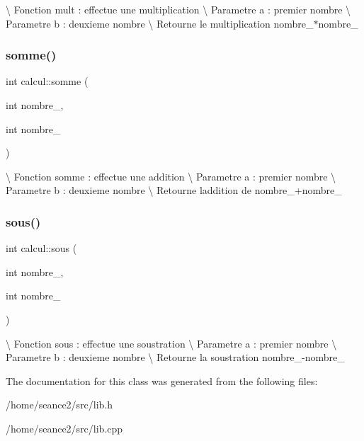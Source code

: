 \textbackslash{} Fonction mult \+: effectue une multiplication \textbackslash{} Parametre a \+: premier nombre \textbackslash{} Parametre b \+: deuxieme nombre \textbackslash{} Retourne le multiplication nombre\+\_$\ast$nombre\+\_ \mbox{\label{classcalcul_a40f51a847c5ac1001051a9631e5e1e08}} 
\subsubsection{\texorpdfstring{somme()}{somme()}}
{\footnotesize\ttfamily int calcul\+::somme (\begin{DoxyParamCaption}\item[{int}]{nombre\+\_,  }\item[{int}]{nombre\+\_ }\end{DoxyParamCaption})}

\textbackslash{} Fonction somme \+: effectue une addition \textbackslash{} Parametre a \+: premier nombre \textbackslash{} Parametre b \+: deuxieme nombre \textbackslash{} Retourne l\textquotesingle{}addition de nombre\+\_+nombre\+\_ \mbox{\label{classcalcul_a4e14ccbad7d73cdcfda888412e1bd959}} 
\subsubsection{\texorpdfstring{sous()}{sous()}}
{\footnotesize\ttfamily int calcul\+::sous (\begin{DoxyParamCaption}\item[{int}]{nombre\+\_,  }\item[{int}]{nombre\+\_ }\end{DoxyParamCaption})}

\textbackslash{} Fonction sous \+: effectue une soustration \textbackslash{} Parametre a \+: premier nombre \textbackslash{} Parametre b \+: deuxieme nombre \textbackslash{} Retourne la soustration nombre\+\_-\/nombre\+\_ 

The documentation for this class was generated from the following files\+:\begin{DoxyCompactItemize}
\item 
/home/seance2/src/lib.\+h\item 
/home/seance2/src/lib.\+cpp\end{DoxyCompactItemize}
